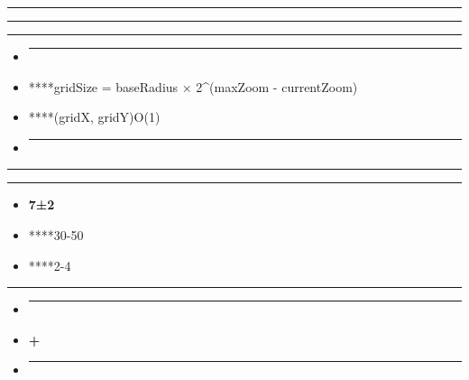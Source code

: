 \begin{center}\rule{0.5\linewidth}{0.5pt}\end{center}

\begin{center}\rule{0.5\linewidth}{0.5pt}\end{center}

\begin{center}\rule{0.5\linewidth}{0.5pt}\end{center}

\begin{itemize}
\item
  \begin{center}\rule{0.5\linewidth}{0.5pt}\end{center}
\item
  ****gridSize = baseRadius × 2\^{}(maxZoom - currentZoom)
\item
  ****(gridX, gridY)O(1)
\item
  \begin{center}\rule{0.5\linewidth}{0.5pt}\end{center}
\end{itemize}

\begin{center}\rule{0.5\linewidth}{0.5pt}\end{center}

\begin{center}\rule{0.5\linewidth}{0.5pt}\end{center}

\begin{itemize}
\tightlist
\item
  \textbf{7±2}
\item
  ****30-50
\item
  ****2-4
\end{itemize}

\begin{center}\rule{0.5\linewidth}{0.5pt}\end{center}

\begin{itemize}
\item
  \begin{center}\rule{0.5\linewidth}{0.5pt}\end{center}
\item
  \textbf{+}
\item
  \begin{center}\rule{0.5\linewidth}{0.5pt}\end{center}
\end{itemize}


